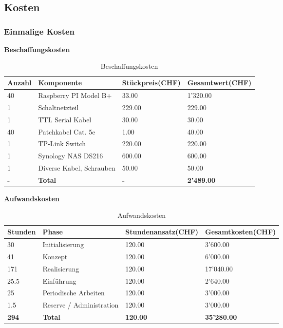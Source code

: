 
\subsection{Kosten}

\subsubsection{Einmalige Kosten}
\textbf{Beschaffungskosten}
\begin{table}[H]
\centering
\begin{tabular}{p{2cm}p{5cm}p{4cm}p{4cm}}
\hline
\rowcolor{heading} \textbf{Anzahl} & \textbf{Komponente} & \hfill \textbf{Stückpreis(CHF)} & \hfill \textbf{Gesamtwert(CHF)} \\\hline
40 & Raspberry PI Model B+ & \hfill 33.00 & \hfill 1'320.00 \\\hline
1 & Schaltnetzteil & \hfill  229.00 & \hfill 229.00 \\\hline
1 & TTL Serial Kabel & \hfill 30.00 & \hfill 30.00 \\\hline
40 & Patchkabel Cat. 5e & \hfill 1.00 & \hfill 40.00 \\\hline
1 & TP-Link Switch & \hfill 220.00 & \hfill 220.00 \\\hline
1 & Synology NAS DS216 & \hfill 600.00 & \hfill 600.00 \\\hline
1 & Diverse Kabel, Schrauben & \hfill 50.00 & \hfill 50.00 \\\hline
\rowcolor{subheading}\textbf{-} & \textbf{Total} & \hfill \textbf{-} & \hfill \textbf{2'489.00} \\\hline
\end{tabular}
\caption{Beschaffungskosten}
\end{table}

\textbf{Aufwandskosten}
\begin{table}[H]
\centering
\begin{tabular}{p{2cm}p{5cm}p{4cm}p{4cm}}
\hline
\rowcolor{heading} \textbf{Stunden} & \textbf{Phase} & \textbf{Stundenansatz(CHF)} &\hfill \textbf{Gesamtkosten(CHF)} \\\hline
30 & Initialisierung & \hfill 120.00 & \hfill 3'600.00 \\\hline
41 & Konzept & \hfill 120.00 & \hfill  6'000.00 \\\hline
171 & Realisierung & \hfill 120.00 & \hfill  17'040.00 \\\hline
25.5 & Einführung & \hfill 120.00 & \hfill 2'640.00 \\\hline
25 & Periodische Arbeiten & \hfill 120.00 & \hfill  3'000.00 \\\hline
1.5 & Reserve / Administration & \hfill 120.00 & \hfill 3'000.00 \\\hline
\rowcolor{subheading}\textbf{294} & \textbf{Total} &\hfill  \textbf{120.00} & \hfill \textbf{35'280.00} \\\hline
\end{tabular}
\caption{Aufwandskosten}
\end{table}

